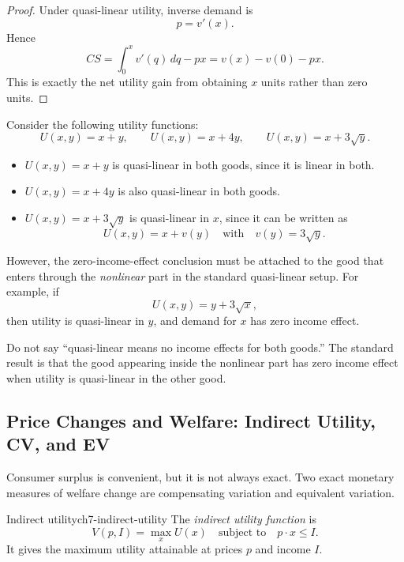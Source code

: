 \begin{proof}
Under quasi-linear utility, inverse demand is
\[
p=v'(x).
\]
Hence
\[
CS = \int_0^x v'(q)\,dq - px
= v(x)-v(0)-px.
\]
This is exactly the net utility gain from obtaining $x$ units rather than zero units.
\end{proof}

\begin{examplebox}[title={Worked Example: identifying quasi-linear utility}]
Consider the following utility functions:
\[
U(x,y)=x+y, \qquad U(x,y)=x+4y, \qquad U(x,y)=x+3\sqrt{y}.
\]

\begin{itemize}
    \item $U(x,y)=x+y$ is quasi-linear in both goods, since it is linear in both.
    \item $U(x,y)=x+4y$ is also quasi-linear in both goods.
    \item $U(x,y)=x+3\sqrt{y}$ is quasi-linear in $x$, since it can be written as
    \[
    U(x,y)=x+v(y)
    \quad \text{with} \quad
    v(y)=3\sqrt{y}.
    \]
\end{itemize}

However, the zero-income-effect conclusion must be attached to the good that enters through the \emph{nonlinear} part in the standard quasi-linear setup. For example, if
\[
U(x,y)=y+3\sqrt{x},
\]
then utility is quasi-linear in $y$, and demand for $x$ has zero income effect.
\end{examplebox}

\begin{commonmistake}
Do not say ``quasi-linear means no income effects for both goods.'' The standard result is that the good appearing inside the nonlinear part has zero income effect when utility is quasi-linear in the other good.
\end{commonmistake}

\subsection{Price Changes and Welfare: Indirect Utility, CV, and EV}

Consumer surplus is convenient, but it is not always exact. Two exact monetary measures of welfare change are compensating variation and equivalent variation.

\begin{definition}{Indirect utility}{ch7-indirect-utility}
The \emph{indirect utility function} is
\[
V(p,I)=\max_{x} U(x)
\quad \text{subject to} \quad
p\cdot x \le I.
\]
It gives the maximum utility attainable at prices $p$ and income $I$.
\end{definition}

